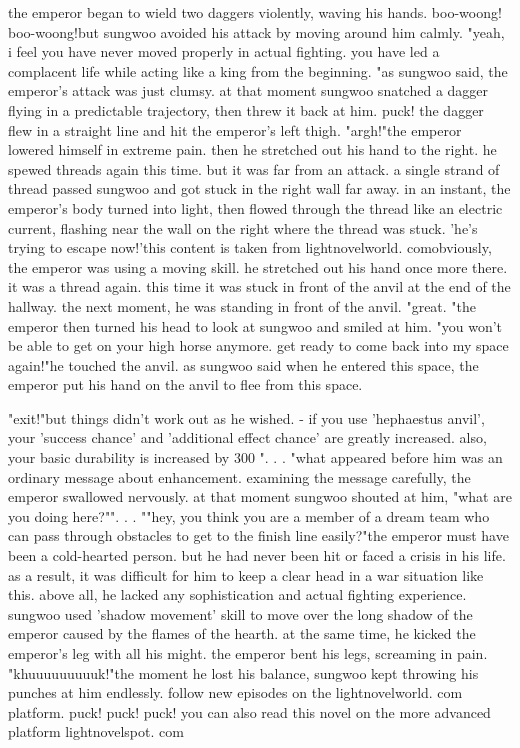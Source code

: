  the emperor began to wield two daggers violently, waving his hands.
 boo-woong! boo-woong!but sungwoo avoided his attack by moving around him calmly.
"yeah, i feel you have never moved properly in actual fighting.
 you have led a complacent life while acting like a king from the beginning.
"as sungwoo said, the emperor's attack was just clumsy.
 at that moment sungwoo snatched a dagger flying in a predictable trajectory, then threw it back at him.
puck! the dagger flew in a straight line and hit the emperor's left thigh.
"argh!"the emperor lowered himself in extreme pain.
 then he stretched out his hand to the right.
he spewed threads again this time.
but it was far from an attack.
 a single strand of thread passed sungwoo and got stuck in the right wall far away.
in an instant, the emperor's body turned into light, then flowed through the thread like an electric current, flashing near the wall on the right where the thread was stuck.
'he's trying to escape now!'this content is taken from lightnovelworld.
comobviously, the emperor was using a moving skill.
 he stretched out his hand once more there.
 it was a thread again.
 this time it was stuck in front of the anvil at the end of the hallway.
the next moment, he was standing in front of the anvil.
"great.
"the emperor then turned his head to look at sungwoo and smiled at him.
"you won't be able to get on your high horse anymore.
 get ready to come back into my space again!"he touched the anvil.
 as sungwoo said when he entered this space, the emperor put his hand on the anvil to flee from this space.


"exit!"but things didn't work out as he wished.
 - if you use 'hephaestus anvil', your 'success chance' and 'additional effect chance' are greatly increased.
 also, your basic durability is increased by 300%
".
.
.
"what appeared before him was an ordinary message about enhancement.
 examining the message carefully, the emperor swallowed nervously.
 at that moment sungwoo shouted at him, "what are you doing here?"".
.
.
""hey, you think you are a member of a dream team who can pass through obstacles to get to the finish line easily?"the emperor must have been a cold-hearted person.
 but he had never been hit or faced a crisis in his life.
 as a result, it was difficult for him to keep a clear head in a war situation like this.
 above all, he lacked any sophistication and actual fighting experience.
sungwoo used 'shadow movement' skill to move over the long shadow of the emperor caused by the flames of the hearth.
at the same time, he kicked the emperor's leg with all his might.
 the emperor bent his legs, screaming in pain.
"khuuuuuuuuuk!"the moment he lost his balance, sungwoo kept throwing his punches at him endlessly.
follow new episodes on the lightnovelworld.
com platform.
puck! puck! puck! you can also read this novel on the more advanced platform lightnovelspot.
com

 